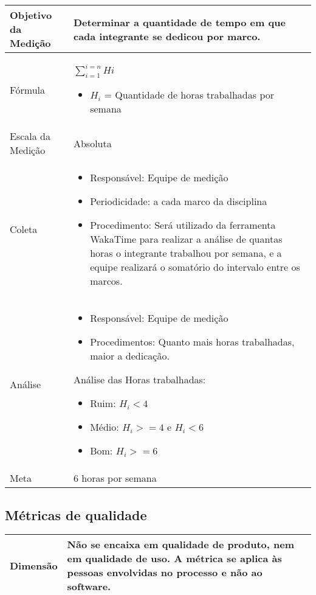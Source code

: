 	\begin{tabular}{ |p{4cm}|p{8cm}|  }
	 \hline
	 Objetivo da Medição 		& Determinar a quantidade de tempo em que cada integrante se dedicou por marco.	   \\ %
	 \hline
	 Fórmula		&  $\sum_{i=1}^{i=n}{Hi}$	\begin{itemize} \item $H_i$ = Quantidade de horas trabalhadas por semana \end{itemize}\\
	 \hline
	 Escala da Medição 		& Absoluta		 \\ 
	 \hline
	 Coleta		& 	\begin{itemize} \item Responsável: Equipe de medição \item Periodicidade: a cada marco da disciplina \item Procedimento: Será utilizado da ferramenta WakaTime para realizar a análise de quantas horas o integrante trabalhou por semana, e a equipe realizará o somatório do intervalo entre os marcos.\end{itemize}	\\
	 \hline
	 Análise		& 	\begin{itemize} \item Responsável: Equipe de medição \item Procedimentos: Quanto mais horas trabalhadas, maior a dedicação. \end{itemize}	 

	 Análise das Horas trabalhadas:
	 \begin{itemize} \item Ruim: $H_i < 4$ \item Médio: $H_i >= 4 $ e $H_i < 6 $ \item Bom: $ H_i >= 6 $\end{itemize}

	 \\

	 \hline
	 Meta		& 	6 horas por semana	 \\
	 \hline
	\end{tabular}

	\subsection{Métricas de qualidade}

	\begin{tabular}{ |p{4cm}|p{8cm}| }
	\hline
	   Dimensão 		& 	Não se encaixa em qualidade de produto, nem em qualidade de uso. A métrica se aplica às pessoas envolvidas no processo e não ao software.	 \\
	 \hline
	\end{tabular}


